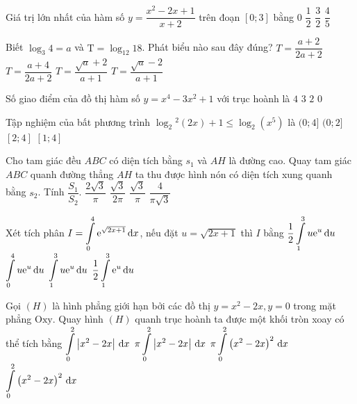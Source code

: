 \begin{ex}%
Giá trị lớn nhất của hàm số $y=\dfrac{x^2-2 x+1}{x+2}$ trên đoạn $[0; 3]$ bằng
\choice
{$0$}
{$\dfrac{1}{2}$}
{$\dfrac{3}{2}$}
{\True $\dfrac{4}{5}$}

\end{ex}
\begin{ex}%
Biết $\log_3 4=a$ và $\mathrm{T}=\log_{12} 18$. Phát biểu nào sau đây đúng?
\choice
{$T=\dfrac{a+2}{2 a+2}$}
{\True $T=\dfrac{a+4}{2 a+2}$}
{$T=\dfrac{\sqrt{a}+2}{a+1}$}
{$T=\dfrac{\sqrt{a}-2}{a+1}$}

\end{ex}
\begin{ex}%
Số giao điểm của đồ thị hàm số $y=x^4-3 x^2+1$ với trục hoành là
\choice
{\True $4$}
{$3$}
{$2$}
{$0$}

\end{ex}
\begin{ex}%
Tập nghiệm của bất phương trình $\log_2{}^2(2 x)+1\leq \log_2\left(x^5\right)$ là
\choice
{$(0; 4]$}
{$(0; 2]$}
{\True $[2; 4]$}
{$[1; 4]$}

\end{ex}
\begin{ex}%
Cho tam giác đều $ABC$ có diện tích bằng $s_1$ và $AH$ là đường cao. Quay tam giác $ABC$ quanh đường thẳng $AH$ ta thu được hình nón có diện tích xung quanh bằng $s_2$. Tính $\dfrac{S_1}{S_2}$.
\choice
{$\dfrac{2\sqrt{3}}{\pi}$}
{\True $\dfrac{\sqrt{3}}{2\pi}$}
{$\dfrac{\sqrt{3}}{\pi}$}
{$\dfrac{4}{\pi \sqrt{3}}$}

\end{ex}
\begin{ex}%
Xét tích phân $I=\displaystyle\displaystyle\int\limits_0^4 {\rm e}^{\sqrt{2 x+1}}\mathrm{\,d}x$, nếu đặt $u=\sqrt{2 x+1}$ thì $I$ bằng
\choice
{$\dfrac{1}{2} \displaystyle\displaystyle\int\limits_1^3 u {\rm e}^{u}\mathrm{\,d}u$}
{$\displaystyle\displaystyle\int\limits_0^4 u {\rm e}^{u}\mathrm{\,d}u$}
{\True $\displaystyle\displaystyle\int\limits_1^3 u {\rm e}^{u}\mathrm{\,d}u$}
{$\dfrac{1}{2} \displaystyle\displaystyle\int\limits_1^3 {\rm e}^{u}\mathrm{\,d}u$}

\end{ex}
\begin{ex}%
Gọi $(H)$ là hình phẳng giới hạn bởi các đồ thị $y=x^2-2 x, y=0$ trong mặt phẳng $\mathrm{Oxy}$. Quay hình $(H)$ quanh trục hoành ta được một khối tròn xoay có thể tích bằng
\choice
{$\displaystyle\displaystyle\int\limits_0^2\left|x^2-2 x\right|\mathrm{\,d}x$}
{$\pi \displaystyle\displaystyle\int\limits_0^2\left|x^2-2 x\right|\mathrm{\,d}x$}
{\True $\pi \displaystyle\displaystyle\int\limits_0^2\left(x^2-2 x\right)^2\mathrm{\,d}x$}
{$\displaystyle\displaystyle\int\limits_0^2\left(x^2-2 x\right)^2\mathrm{\,d}x$}

\end{ex}
